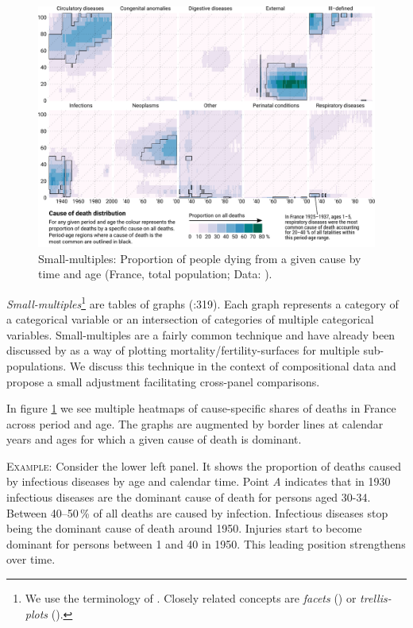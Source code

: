 \documentclass{scrartcl}
\begin{document}
\begin{figure}
  \centering
  \includegraphics[width = \linewidth]{../fig/small_multiples.pdf}
  \caption{Small-multiples: Proportion of people dying from a given cause by time and age (France, total population; Data: \cite{Vallin2014}).}
  \label{fig:smg}
\end{figure}

\emph{Small-multiples}\footnote{We use the terminology of \textcite{Tufte1990}. Closely related concepts are \emph{facets} (\cite{Wilkinson2005}) or \emph{trellis-plots} (\cite{Becker1996}).} are tables of graphs (\cite{Wilkinson2005}:319). Each graph represents a category of a categorical variable or an intersection of categories of multiple categorical variables. Small-multiples are a fairly common technique and have already been discussed by \textcite{Vaupel1987} as a way of plotting mortality/fertility-surfaces for multiple sub-populations. We discuss this technique in the context of compositional data and propose a small adjustment facilitating cross-panel comparisons.

In figure \ref{fig:smg} we see multiple heatmaps of cause-specific shares of deaths in France across period and age. The graphs are augmented by border lines at calendar years and ages for which a given cause of death is dominant. 

\textsc{Example:} Consider the lower left panel. It shows the proportion of deaths caused by infectious diseases by age and calendar time. Point \emph{A} indicates that in 1930 infectious diseases are the dominant cause of death for persons aged 30-34. Between 40--50\,\% of all deaths are caused by infection. Infectious diseases stop being the dominant cause of death around 1950. Injuries start to become dominant for persons between 1 and 40 in 1950. This leading position strengthens over time.
\end{document}
